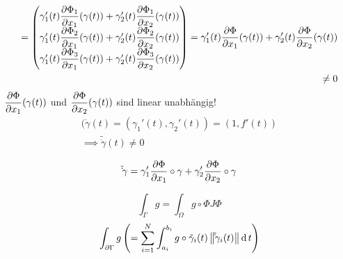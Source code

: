 \begin{Bem}
\begin{enumerate}
\begin{eqnarray*}
        = \begin{pmatrix}
          \gamma_1'(t)\dfrac{\partial \Phi_1}{\partial x_1}(\gamma(t)) + \gamma_2'(t)\dfrac{\partial \Phi_1}{\partial x_2}(\gamma(t))\\
          \gamma_1'(t)\dfrac{\partial \Phi_2}{\partial x_1}(\gamma(t)) + \gamma_2'(t)\dfrac{\partial \Phi_2}{\partial x_2}(\gamma(t))\\
          \gamma_1'(t)\dfrac{\partial \Phi_3}{\partial x_1}(\gamma(t)) + \gamma_2'(t)\dfrac{\partial \Phi_3}{\partial x_2}(\gamma(t))
        \end{pmatrix}
        = \gamma_1'(t)\dfrac{\partial \Phi}{\partial x_1}(\gamma(t)) + \gamma_2'(t)\dfrac{\partial \Phi}{\partial x_2}(\gamma(t))\\
        \neq 0
      \end{eqnarray*}
      $\dfrac{\partial \Phi}{\partial x_1}(\gamma(t))$ und $\dfrac{\partial \Phi}{\partial x_2}(\gamma(t))$ sind linear unabhängig!
      \begin{eqnarray*}
        (\dot\gamma(t)=(\gamma_1'(t),\gamma_2'(t))=(1,f'(t))\\
        \implies \tilde\dot\gamma(t)\neq 0
      \end{eqnarray*}
  \end{enumerate}
\end{Bem}
\begin{Lem}
  \begin{equation}
    \label{e:1106011}
    \tilde\dot\gamma=\gamma_1'\dfrac{\partial \Phi}{\partial x_1}\circ\gamma + \gamma_2'\dfrac{\partial \Phi}{\partial x_2}\circ\gamma
  \end{equation}
\end{Lem}
\begin{Bem}
  \[\int_\Gamma g=\int_\Omega g\circ\Phi J\Phi\]
  \[\int_{\partial\Gamma}g\left( =\sum_{i=1}^N\int_{a_i}^{b_i}g\circ\tilde\gamma_i(t)\left\| \tilde\dot\gamma_i(t) \right\|\operatorname{d} t \right)\]
\end{Bem}
